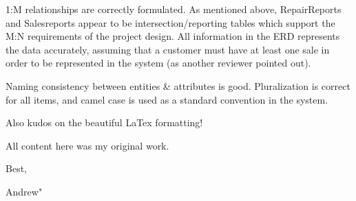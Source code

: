 \documentclass{article}
\begin{document}
\begin{tcolorbox}[colback=secondarycolor, colframe=primarycolor, title=\textbf{Step 1: Peer Review 2 - Andrew Mathena}]
\vspace{0.2cm}

1:M relationships are correctly formulated. As mentioned above, RepairReports and Salesreports appear to be intersection/reporting tables which support the M:N requirements of the project design. All information in the ERD represents the data accurately, assuming that a customer must have at least one sale in order to be represented in the system (as another reviewer pointed out).

\vspace{0.2cm}

Naming consistency between entities \& attributes is good. Pluralization is correct for all items, and camel case is used as a standard convention in the system.

\vspace{0.2cm}

Also kudos on the beautiful LaTex formatting!

\vspace{0.2cm}

All content here was my original work.

\vspace{0.2cm}

Best,

\vspace{0.2cm}

Andrew"
\vspace{0.2cm}
\end{tcolorbox}
\end{document}
